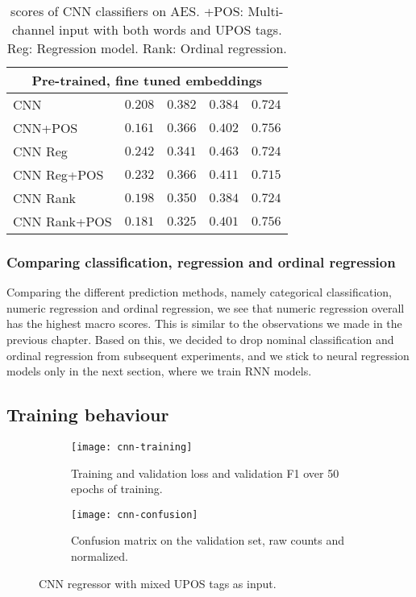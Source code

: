 \begin{table}
\begin{tabular}{lrrrr}
    \midrule
    \multicolumn{5}{c}{Pre-trained, fine tuned embeddings} \\
    \midrule
    CNN & $0.208$ & $0.382$ & $0.384$ & $0.724$ \\
    CNN+POS & $0.161$ & $0.366$ & $0.402$ & $\mathbf{0.756}$ \\
    CNN Reg & $0.242$ & $0.341$ & $\mathbf{0.463}$ & $0.724$ \\
    CNN Reg+POS & $0.232$ & $0.366$ & $0.411$ & $0.715$ \\
    CNN Rank & $0.198$ & $0.350$ & $0.384$ & $0.724$ \\
    CNN Rank+POS & $0.181$ & $0.325$ & $0.401$ & $\mathbf{0.756}$ \\
    \bottomrule
  \end{tabular}
  \caption[\FI scores of CNN classifiers on AES.]{
    \FI scores of CNN classifiers on AES. +POS: Multi-channel input with
    both words and UPOS tags. Reg: Regression model. Rank: Ordinal regression.
  }
  \label{tab:cnn-results}
\end{table}


\subsubsection{Comparing classification, regression and ordinal regression}

Comparing the different prediction methods, namely categorical
classification, numeric regression and ordinal regression, we see that
numeric regression overall has the highest macro \FI scores. This is similar
to the observations we made in the previous chapter. Based on this, we
decided to drop nominal classification and ordinal regression from subsequent
experiments, and we stick to neural regression models only in the next
section, where we train \ac{RNN} models.


\subsection{Training behaviour}

\begin{figure}
  \begin{subfigure}{\linewidth}
    \centering
    \texttt{[image: cnn-training]}
    \caption{
      Training and validation loss and validation F1 over 50 epochs of
      training.
    }
  \end{subfigure}
  \begin{subfigure}{\linewidth}
    \centering
    \texttt{[image: cnn-confusion]}
    \caption{
      Confusion matrix on the validation set, raw counts and normalized.
    }
  \end{subfigure}
  \caption[Training behaviour of CNN regression]{
    CNN regressor with mixed UPOS tags as input.
  }
  \label{fig:cnn-training}
\end{figure}

